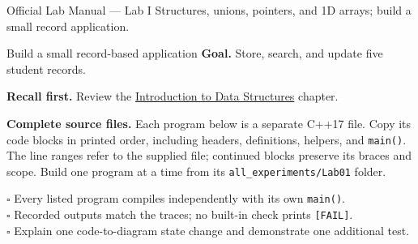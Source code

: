 
\begin{sourcealignment}{Official Lab Manual --- Lab I}
Structures, unions, pointers, and 1D arrays; build a small record application.
\end{sourcealignment}

\begin{labproject}{Build a small record-based application}
\textbf{Goal.} Store, search, and update five student records.

\textbf{Recall first.} Review the \hyperref[ch:introduction]{Introduction to Data Structures} chapter.

\textbf{Complete source files.} Each program below is a separate C++17 file.
Copy its code blocks in printed order, including headers, definitions, helpers, and \texttt{main()}.
The line ranges refer to the supplied file; continued blocks preserve its braces and scope.
Build one program at a time from its \texttt{all\_experiments/Lab01} folder.



\tcbbreak

\end{labproject}

\begin{verification}
$\square$ Every listed program compiles independently with its own \texttt{main()}.\\
$\square$ Recorded outputs match the traces; no built-in check prints \texttt{[FAIL]}.\\
$\square$ Explain one code-to-diagram state change and demonstrate one additional test.
\end{verification}
